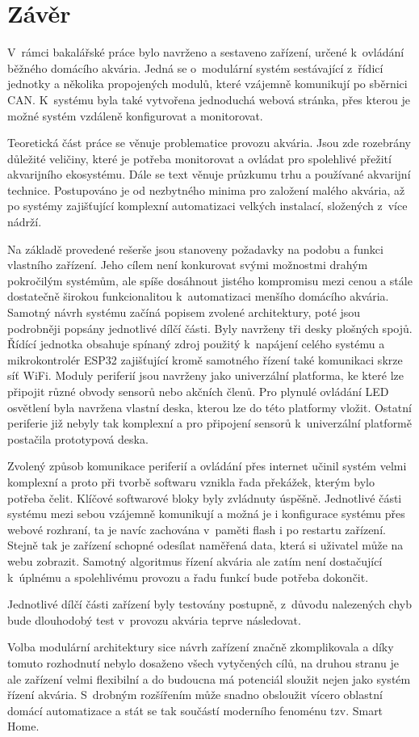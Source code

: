 \chapter*{Závěr}
{}

V~rámci bakalářské práce bylo navrženo a sestaveno zařízení, určené k~ovládání běžného domácího akvária. Jedná se o~modulární systém sestávající z~řídicí jednotky a několika propojených modulů, které vzájemně komunikují po sběrnici CAN. K~systému byla také vytvořena jednoduchá webová stránka, přes kterou je možné systém vzdáleně konfigurovat a monitorovat. 

Teoretická část práce se věnuje problematice provozu akvária. Jsou zde rozebrány důležité veličiny, které je potřeba monitorovat a ovládat pro spolehlivé přežití akvarijního ekosystému. Dále se text věnuje průzkumu trhu a používané akvarijní technice. Postupováno je od nezbytného minima pro založení malého akvária, až po systémy zajišťující komplexní automatizaci velkých instalací, složených z~více nádrží.

Na základě provedené rešerše jsou stanoveny požadavky na podobu a funkci vlastního zařízení. Jeho cílem není konkurovat svými možnostmi drahým pokročilým systémům, ale spíše dosáhnout jistého kompromisu mezi cenou a stále dostatečně širokou funkcionalitou k~automatizaci menšího domácího akvária. Samotný návrh systému začíná popisem zvolené architektury, poté jsou podrobněji popsány jednotlivé dílčí části. Byly navrženy tři desky plošných spojů. Řídící jednotka obsahuje spínaný zdroj použitý k~napájení celého systému a mikrokontrolér ESP32 zajišťující kromě samotného řízení také komunikaci skrze síť WiFi. Moduly periferií jsou navrženy jako univerzální platforma, ke které lze připojit různé obvody sensorů nebo akčních členů. Pro plynulé ovládání LED osvětlení byla navržena vlastní deska, kterou lze do této platformy vložit. Ostatní periferie již nebyly tak komplexní a pro připojení sensorů k~univerzální platformě postačila prototypová deska. 

Zvolený způsob komunikace periferií a ovládání přes internet učinil systém velmi komplexní a proto při tvorbě softwaru vznikla řada překážek, kterým bylo potřeba čelit. Klíčové softwarové bloky byly zvládnuty úspěšně. Jednotlivé části systému mezi sebou vzájemně komunikují a možná je i konfigurace systému přes webové rozhraní, ta je navíc zachována v~paměti flash i po restartu zařízení. Stejně tak je zařízení schopné odesílat naměřená data, která si uživatel může na webu zobrazit. Samotný algoritmus řízení akvária ale zatím není dostačující k~úplnému a spolehlivému provozu a řadu funkcí bude potřeba dokončit. 

Jednotlivé dílčí části zařízení byly testovány postupně, z~důvodu nalezených chyb bude dlouhodobý test v~provozu akvária teprve následovat. 

Volba modulární architektury sice návrh zařízení značně zkomplikovala a díky tomuto rozhodnutí nebylo dosaženo všech vytyčených cílů, na druhou stranu je ale zařízení velmi flexibilní a do budoucna má potenciál sloužit nejen jako systém řízení akvária. S~drobným rozšířením může snadno obsloužit vícero oblastní domácí automatizace a stát se tak součástí moderního fenoménu tzv. Smart Home.